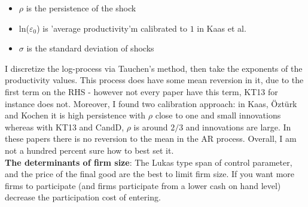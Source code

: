 \documentclass[12pt]{article}
\begin{document}
\begin{itemize}\setlength\itemsep{0em} \small
    \item $\rho$ is the persistence of the shock
    \item ln($\varepsilon_0$) is 'average productivity'm calibrated to $1$ in Kaas et al.
    \item $\sigma$ is the standard deviation of shocks
\end{itemize} \normalsize
I discretize the log-process via Tauchen's method, then take the exponents of the productivity values. This process does have some mean reversion in it, due to the first term on the RHS - however not every paper have this term, KT13 for instance does not. Moreover, I found two calibration approach: in Kaas, Öztürk and Kochen it is high persistence with $\rho$ close to one and small innovations whereas with KT13 and CandD, $\rho$ is around $2/3$ and innovations are large. In these papers there is no reversion to the mean in the AR process. Overall, I am not a hundred percent sure how to best set it.  \vspace{3mm} \\
\textbf{The determinants of firm size}: The Lukas type span of control parameter, and the price of the final good are the best to limit firm size. If you want more firms to participate (and firms participate from a lower cash on hand level) decrease the participation cost of entering.
\end{document}
